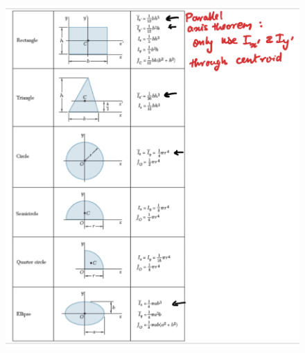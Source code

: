 \begin{figure}[!h]
\centering
\includegraphics[angle=0, width=\textwidth]{MOIFigures/TypicalMOI.png}
\vspace{-2mm}
\caption{\small {}}
\vspace{-3mm}
\label{Fig:TypicalMOI}
\end{figure}

